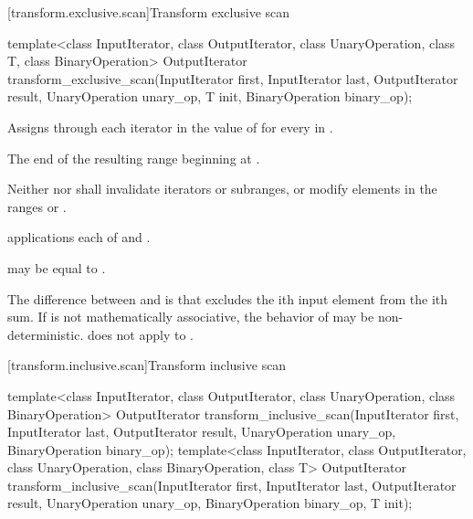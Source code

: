 [transform.exclusive.scan]{Transform exclusive scan}

%
\begin{itemdecl}
template<class InputIterator, class OutputIterator,
         class UnaryOperation,
         class T, class BinaryOperation>
  OutputIterator transform_exclusive_scan(InputIterator first, InputIterator last,
                                          OutputIterator result,
                                          UnaryOperation unary_op,
                                          T init, BinaryOperation binary_op);
\end{itemdecl}

\begin{itemdescr}
\pnum
\effects
Assigns through each iterator  in  the value of
for every  in .

\pnum
\returns
The end of the resulting range beginning at .

\pnum
\requires
Neither  nor  shall invalidate iterators or
subranges, or modify elements in the ranges
 or
.

\pnum
\complexity
{} applications each of  and
.

\pnum
\remarks
{} may be equal to .

\pnum
\realnotes
The difference between  and
 is that 
excludes the ith input element from the ith sum. If  is not
mathematically associative, the behavior of 
may be non-deterministic.  does not apply
 to .
\end{itemdescr}

[transform.inclusive.scan]{Transform inclusive scan}

%
\begin{itemdecl}
template<class InputIterator, class OutputIterator,
         class UnaryOperation,
         class BinaryOperation>
  OutputIterator transform_inclusive_scan(InputIterator first, InputIterator last,
                                          OutputIterator result,
                                          UnaryOperation unary_op,
                                          BinaryOperation binary_op);
template<class InputIterator, class OutputIterator,
         class UnaryOperation,
         class BinaryOperation, class T>
  OutputIterator transform_inclusive_scan(InputIterator first, InputIterator last,
                                          OutputIterator result,
                                          UnaryOperation unary_op,
                                          BinaryOperation binary_op, T init);
\end{itemdecl}

